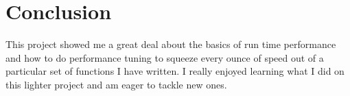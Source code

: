 \documentclass[11pt]{article}
\begin{document}
\section{Conclusion}
This project showed me a great deal about the basics of run time performance and how to do performance tuning to squeeze every ounce of speed out of a particular set of functions I have written. I really enjoyed learning what I did on this lighter project and am eager to tackle new ones.
\end{document}
